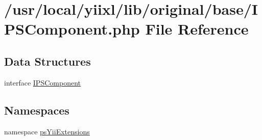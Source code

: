 \hypertarget{IPSComponent_8php}{
\section{/usr/local/yiixl/lib/original/base/IPSComponent.php File Reference}
\label{IPSComponent_8php}
}
\subsection*{Data Structures}
\begin{DoxyCompactItemize}
\item 
interface \hyperlink{interfaceIPSComponent}{IPSComponent}
\end{DoxyCompactItemize}
\subsection*{Namespaces}
\begin{DoxyCompactItemize}
\item 
namespace \hyperlink{namespacepsYiiExtensions}{psYiiExtensions}
\end{DoxyCompactItemize}
